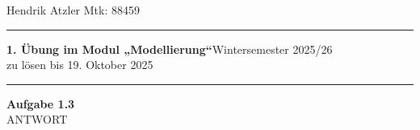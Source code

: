 \documentclass[a4paper,12pt]{article}
\begin{document}
Hendrik Atzler \hfill Mtk: 88459

\rule{\textwidth}{0.4pt}


{\textbf{1. Übung im Modul „Modellierung“}\hfill Wintersemester 2025/26} \\
zu lösen bis 19. Oktober 2025 \\
\rule{\textwidth}{0.4pt}

{\large{\textbf{Aufgabe 1.3}}} \\

ANTWORT
\end{document}
